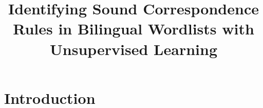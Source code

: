 \documentclass{article}
\title{Identifying Sound Correspondence Rules in Bilingual Wordlists with Unsupervised Learning}
\begin{document}
\maketitle

\section{Introduction}

\citep{rama2017fast}
\citep{kondrak2009identification}
\citep{kondrak2003identifying}
\citep{rama2013two}
\citep{oakes2000computer}



\end{document}
